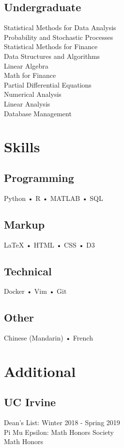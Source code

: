 \documentclass[]{deedy-resume-openfont}
\begin{document}
\begin{minipage}[t]{0.33\textwidth}
\subsection{Undergraduate} 
Statistical Methods for Data Analysis \\
Probability and Stochastic Processes \\
Statistical Methods for Finance \\
Data Structures and Algorithms  \\
Linear Algebra \\
Math for Finance \\ 
Partial Differential Equations \\
Numerical Analysis \\
Linear Analysis \\
Database Management \\
\sectionsep


\section{Skills}
\subsection{Programming}
Python • R • MATLAB • SQL 
\subsection{Markup}
{\LaTeX} • HTML • CSS • D3
\subsection{Technical}
Docker • Vim • Git
\subsection{Other}
Chinese (Mandarin) • French
\sectionsep


\section{Additional}
\subsection{UC Irvine}
Dean's List: Winter 2018 - Spring 2019 \\
Pi Mu Epsilon: Math Honors Society \\
Math Honors

\end{minipage}
\end{document}

